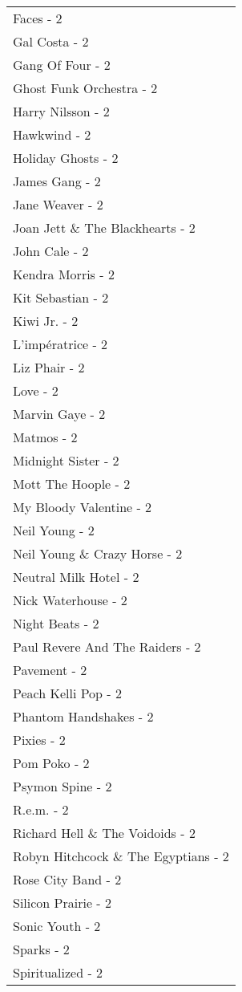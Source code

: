 \documentclass[
]{article}
\begin{document}
\begin{longtable}{l}
Faces - 2 \\ 
Gal Costa - 2 \\ 
Gang Of Four - 2 \\ 
Ghost Funk Orchestra - 2 \\ 
Harry Nilsson - 2 \\ 
Hawkwind - 2 \\ 
Holiday Ghosts - 2 \\ 
James Gang - 2 \\ 
Jane Weaver - 2 \\ 
Joan Jett \& The Blackhearts - 2 \\ 
John Cale - 2 \\ 
Kendra Morris - 2 \\ 
Kit Sebastian - 2 \\ 
Kiwi Jr. - 2 \\ 
L'impératrice - 2 \\ 
Liz Phair - 2 \\ 
Love - 2 \\ 
Marvin Gaye - 2 \\ 
Matmos - 2 \\ 
Midnight Sister - 2 \\ 
Mott The Hoople - 2 \\ 
My Bloody Valentine - 2 \\ 
Neil Young - 2 \\ 
Neil Young \& Crazy Horse - 2 \\ 
Neutral Milk Hotel - 2 \\ 
Nick Waterhouse - 2 \\ 
Night Beats - 2 \\ 
Paul Revere And The Raiders - 2 \\ 
Pavement - 2 \\ 
Peach Kelli Pop - 2 \\ 
Phantom Handshakes - 2 \\ 
Pixies - 2 \\ 
Pom Poko - 2 \\ 
Psymon Spine - 2 \\ 
R.e.m. - 2 \\ 
Richard Hell \& The Voidoids - 2 \\ 
Robyn Hitchcock \& The Egyptians - 2 \\ 
Rose City Band - 2 \\ 
Silicon Prairie - 2 \\ 
Sonic Youth - 2 \\ 
Sparks - 2 \\ 
Spiritualized - 2 \\ 

\end{longtable}
\end{document}
